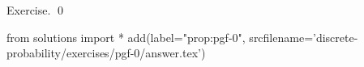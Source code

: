 
\begin{prop}
  \label{prop:pgf-0}
  
\end{prop}
\proof
Exercise.
\qed
\begin{python0}
from solutions import *
add(label="prop:pgf-0",
    srcfilename='discrete-probability/exercises/pgf-0/answer.tex') 
\end{python0}
